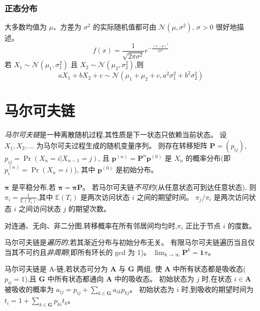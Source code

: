 \subsubsection{正态分布}
大多数均值为 $\mu$、方差为 $\sigma^2$ 的实际随机值都可由 $\mathcal{N}(\mu,\sigma^2),\,\sigma>0$ 很好地描述。
\[ f(x) = \frac{1}{\sqrt{2\pi\sigma^2}}e^{-\frac{(x-\mu)^2}{2\sigma^2}} \]
若 $X_1 \sim \mathcal{N}(\mu_1,\sigma_1^2)$ 且 $X_2 \sim \mathcal{N}(\mu_2,\sigma_2^2)$,则
\[ aX_1 + bX_2 + c \sim \mathcal{N}(\mu_1+\mu_2+c,a^2\sigma_1^2+b^2\sigma_2^2) \]

\section{马尔可夫链}
\emph{马尔可夫链}是一种离散随机过程,其性质是下一状态只依赖当前状态。
设 $X_1,X_2,\ldots$ 为马尔可夫过程生成的随机变量序列。
则存在转移矩阵 $\mathbf{P} = (p_{ij})$,$p_{ij} = \Pr(X_n = i | X_{n-1} = j)$,
且 $\mathbf{p}^{(n)} = \mathbf P^n \mathbf p^{(0)}$ 是 $X_n$ 的概率分布(即 $p^{(n)}_i = \Pr(X_n = i)$),
其中 $\mathbf{p}^{(0)}$ 是初始分布。

$\mathbf{\pi}$ 是平稳分布,若 $\mathbf{\pi} = \mathbf{\pi P}$。
若马尔可夫链\emph{不可约}(从任意状态可到达任意状态),
则 $\pi_i = \frac{1}{\mathbb{E}(T_i)}$,其中 $\mathbb{E}(T_i)$ 是两次访问状态 $i$ 之间的期望时间。
$\pi_j/\pi_i$ 是两次访问状态 $i$ 之间访问状态 $j$ 的期望次数。

对连通、无向、非二分图,转移概率在所有邻居间均匀时,$\pi_i$ 正比于节点 $i$ 的度数。

马尔可夫链是\emph{遍历的},若其渐近分布与初始分布无关。
有限马尔可夫链遍历当且仅当其不可约且\emph{非周期}(即所有环长的 gcd 为 1)。
$\lim_{k\rightarrow\infty}\mathbf{P}^k = \mathbf{1}\pi$。

马尔可夫链是 A-链,若状态可分为 $\mathbf{A}$ 与 $\mathbf{G}$ 两组,
使 $\mathbf{A}$ 中所有状态都是吸收态($p_{ii}=1$),且 $\mathbf{G}$ 中所有状态都通向 $\mathbf{A}$ 中的吸收态。
初始状态为 $j$ 时,在状态 $i\in\mathbf{A}$ 被吸收的概率为 $a_{ij} = p_{ij}+\sum_{k\in\mathbf{G}} a_{ik}p_{kj}$。
初始状态为 $i$ 时,到吸收的期望时间为 $t_i = 1+\sum_{k\in\mathbf{G}}p_{ki}t_k$。
